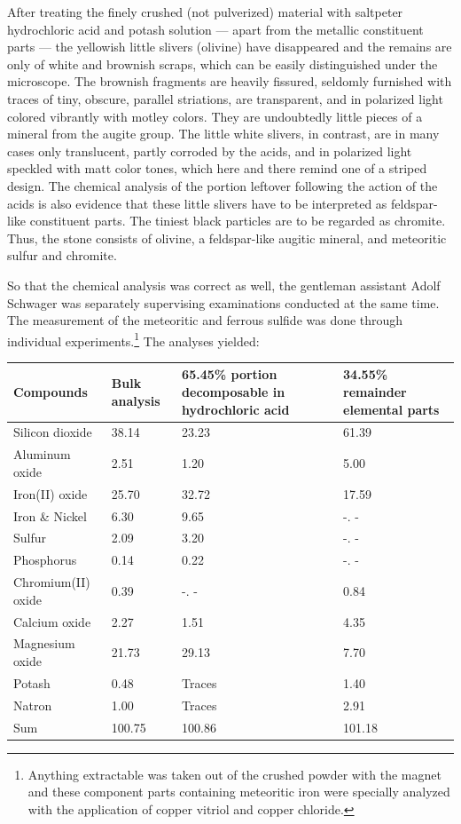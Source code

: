\documentclass[a4paper, 12pt, oneside]{article}
\begin{document}
After treating the finely crushed (not pulverized) material with saltpeter hydrochloric acid and potash solution --- apart from the metallic constituent parts --- the yellowish little slivers (olivine) have disappeared and the remains are only of white and brownish scraps, which can be easily distinguished under the microscope. The brownish fragments are heavily fissured, seldomly furnished with traces of tiny, obscure, parallel striations, are transparent, and in polarized light colored vibrantly with motley colors. They are undoubtedly little pieces of a mineral from the augite group. The little white slivers, in contrast, are in many cases only translucent, partly corroded by the acids, and in polarized light speckled with matt color tones, which here and there remind one of a striped design. The chemical analysis of the portion leftover following the action of the acids is also evidence that these little slivers have to be interpreted as feldspar-like constituent parts. The tiniest black particles are to be regarded as chromite. Thus, the stone consists of olivine, a feldspar-like augitic mineral, and meteoritic sulfur and chromite.

So that the chemical analysis was correct as well, the gentleman assistant Adolf Schwager was separately supervising examinations conducted at the same time. The measurement of the meteoritic and ferrous sulfide was done through individual experiments.\footnote{Anything extractable was taken out of the crushed powder with the magnet and these component parts containing meteoritic iron were specially analyzed with the application of copper vitriol and copper chloride.} The analyses yielded:
\begin{center}
    \begin{tabular}{ |l|p{1.5cm}|p{3.2cm}|p{2.9cm}| }
    \hline
    Compounds & Bulk analysis & 65.45\% portion decomposable in hydrochloric acid & 34.55\% remainder elemental parts\\\hline
    Silicon dioxide & 38.14 & 23.23 & 61.39\\\hline
    Aluminum oxide & 2.51 & 1.20 & 5.00\\\hline
    Iron(II) oxide & 25.70 & 32.72 & 17.59\\\hline
    Iron \& Nickel & 6.30 & 9.65 & -. -\\\hline
    Sulfur & 2.09 & 3.20 & -. -\\\hline
    Phosphorus & 0.14 & 0.22 & -. -\\\hline
    Chromium(II) oxide & 0.39 & -. - & 0.84\\\hline
    Calcium oxide & 2.27 & 1.51 & 4.35\\\hline
    Magnesium oxide & 21.73 & 29.13 & 7.70\\\hline
    Potash & 0.48 & Traces & 1.40\\\hline
    Natron & 1.00 & Traces & 2.91\\\hline
    Sum & 100.75 & 100.86 & 101.18\\
    \hline
    \end{tabular}
\end{center}
\end{document}
